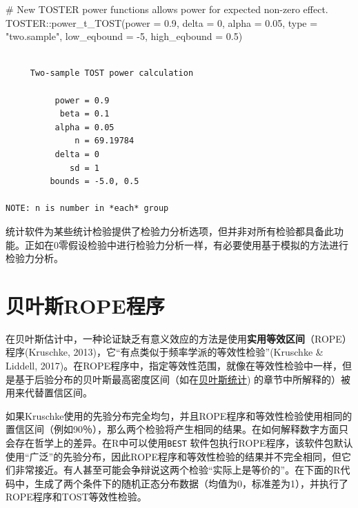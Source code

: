 \documentclass[
  letterpaper,
  DIV=11,
  numbers=noendperiod]{scrreprt}
\newenvironment{Shaded}{\begin{snugshade}}{\end{snugshade}}
\newcommand{\AttributeTok}[1]{\textcolor[rgb]{0.40,0.45,0.13}{#1}}
\newcommand{\CommentTok}[1]{\textcolor[rgb]{0.37,0.37,0.37}{#1}}
\newcommand{\DecValTok}[1]{\textcolor[rgb]{0.68,0.00,0.00}{#1}}
\newcommand{\FloatTok}[1]{\textcolor[rgb]{0.68,0.00,0.00}{#1}}
\newcommand{\FunctionTok}[1]{\textcolor[rgb]{0.28,0.35,0.67}{#1}}
\newcommand{\NormalTok}[1]{\textcolor[rgb]{0.00,0.23,0.31}{#1}}
\newcommand{\SpecialCharTok}[1]{\textcolor[rgb]{0.37,0.37,0.37}{#1}}
\newcommand{\StringTok}[1]{\textcolor[rgb]{0.13,0.47,0.30}{#1}}
\begin{document}
\begin{Shaded}
\begin{Highlighting}[]
\CommentTok{\# New TOSTER power functions allows power for expected non{-}zero effect.}
\NormalTok{TOSTER}\SpecialCharTok{::}\FunctionTok{power\_t\_TOST}\NormalTok{(}\AttributeTok{power =} \FloatTok{0.9}\NormalTok{, }\AttributeTok{delta =} \DecValTok{0}\NormalTok{,}
                     \AttributeTok{alpha =} \FloatTok{0.05}\NormalTok{, }\AttributeTok{type =} \StringTok{"two.sample"}\NormalTok{,}
                     \AttributeTok{low\_eqbound =} \SpecialCharTok{{-}}\DecValTok{5}\NormalTok{, }\AttributeTok{high\_eqbound =} \FloatTok{0.5}\NormalTok{)}
\end{Highlighting}
\end{Shaded}

\begin{verbatim}

     Two-sample TOST power calculation 

          power = 0.9
           beta = 0.1
          alpha = 0.05
              n = 69.19784
          delta = 0
             sd = 1
         bounds = -5.0, 0.5

NOTE: n is number in *each* group
\end{verbatim}

统计软件为某些统计检验提供了检验力分析选项，但并非对所有检验都具备此功能。正如在0零假设检验中进行检验力分析一样，有必要使用基于模拟的方法进行检验力分析。

\hypertarget{sec-ROPE}{%
\section{贝叶斯ROPE程序}\label{sec-ROPE}}

在贝叶斯估计中，一种论证缺乏有意义效应的方法是使用\textbf{实用等效区间}（ROPE）程序(Kruschke,
2013)，它``有点类似于频率学派的等效性检验''(Kruschke \& Liddell,
2017)。在ROPE程序中，指定等效性范围，就像在等效性检验中一样，但是基于后验分布的贝叶斯最高密度区间（如在\protect\hyperlink{ux8d1dux53f6ux65af}{贝叶斯统计})
的章节中所解释的）被用来代替置信区间。

如果Kruschke使用的先验分布完全均匀，并且ROPE程序和等效性检验使用相同的置信区间（例如90％），那么两个检验将产生相同的结果。在如何解释数字方面只会存在哲学上的差异。在R中可以使用\texttt{BEST}
软件包执行ROPE程序，该软件包默认使用``广泛''的先验分布，因此ROPE程序和等效性检验的结果并不完全相同，但它们非常接近。有人甚至可能会争辩说这两个检验``实际上是等价的''。在下面的R代码中，生成了两个条件下的随机正态分布数据（均值为0，标准差为1），并执行了ROPE程序和TOST等效性检验。
\end{document}
